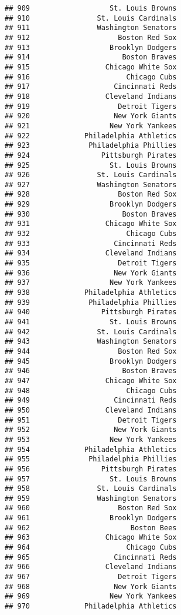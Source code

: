 \documentclass[]{article}
\begin{document}
\begin{verbatim}
## 909                   St. Louis Browns
## 910                St. Louis Cardinals
## 911                Washington Senators
## 912                     Boston Red Sox
## 913                   Brooklyn Dodgers
## 914                      Boston Braves
## 915                  Chicago White Sox
## 916                       Chicago Cubs
## 917                    Cincinnati Reds
## 918                  Cleveland Indians
## 919                     Detroit Tigers
## 920                    New York Giants
## 921                   New York Yankees
## 922             Philadelphia Athletics
## 923              Philadelphia Phillies
## 924                 Pittsburgh Pirates
## 925                   St. Louis Browns
## 926                St. Louis Cardinals
## 927                Washington Senators
## 928                     Boston Red Sox
## 929                   Brooklyn Dodgers
## 930                      Boston Braves
## 931                  Chicago White Sox
## 932                       Chicago Cubs
## 933                    Cincinnati Reds
## 934                  Cleveland Indians
## 935                     Detroit Tigers
## 936                    New York Giants
## 937                   New York Yankees
## 938             Philadelphia Athletics
## 939              Philadelphia Phillies
## 940                 Pittsburgh Pirates
## 941                   St. Louis Browns
## 942                St. Louis Cardinals
## 943                Washington Senators
## 944                     Boston Red Sox
## 945                   Brooklyn Dodgers
## 946                      Boston Braves
## 947                  Chicago White Sox
## 948                       Chicago Cubs
## 949                    Cincinnati Reds
## 950                  Cleveland Indians
## 951                     Detroit Tigers
## 952                    New York Giants
## 953                   New York Yankees
## 954             Philadelphia Athletics
## 955              Philadelphia Phillies
## 956                 Pittsburgh Pirates
## 957                   St. Louis Browns
## 958                St. Louis Cardinals
## 959                Washington Senators
## 960                     Boston Red Sox
## 961                   Brooklyn Dodgers
## 962                        Boston Bees
## 963                  Chicago White Sox
## 964                       Chicago Cubs
## 965                    Cincinnati Reds
## 966                  Cleveland Indians
## 967                     Detroit Tigers
## 968                    New York Giants
## 969                   New York Yankees
## 970             Philadelphia Athletics

\end{verbatim}
\end{document}
